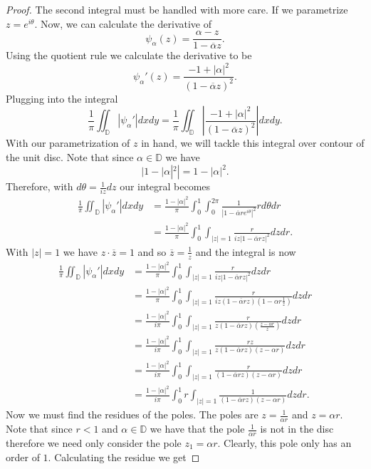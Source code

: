 \documentclass{article}
\begin{document}
\begin{proof}
  The second integral must be handled with more care. If we parametrize $z = e^{i \theta}$. Now, we can calculate the derivative of 
  \[
  \psi_{\alpha}(z) = \frac{\alpha - z}{1 - \overline{\alpha}z}.  
  \]
  Using the quotient rule we calculate the derivative to be
  \[
   \psi_{\alpha}'(z) = \frac{-1 +|\alpha|^2}{(1 - \overline{\alpha}z)^2}.
    \]
    Plugging into the integral 
    \[
    \frac{1}{\pi}\iint_{\mathbb{D}} |\psi_{\alpha}'|dxdy = \frac{1}{\pi}\iint_{\mathbb{D}} \left|\frac{-1 + |\alpha|^2}{(1 - \overline{\alpha}z)^2} \right|dxdy.
    \]
    With our parametrization of $z$ in hand, we will tackle this integral over contour of the unit disc. Note that since $\alpha \in \mathbb{D}$ we have
    \[
    |1 - |\alpha|^2| = 1 - |\alpha|^2.  
    \]
    Therefore, with $d \theta = \frac{1}{iz}dz$ our integral becomes
    \begin{align*}
      \frac{1}{\pi}\iint_{\mathbb{D}} |\psi_{\alpha}'|dxdy &= \frac{1 - |\alpha|^2}{\pi}\int_0^1\int_{0}^{2\pi} \frac{1}{|1 - \overline{\alpha}re^{i \theta}|^2}r d\theta dr  \\
      &= \frac{1 - |\alpha|^2}{\pi}\int_0^1\int_{|z| = 1} \frac{r}{iz|1 - \overline{\alpha} rz|^2}dz dr.
    \end{align*}
    With $|z| = 1$ we have $z\cdot \overline{z} = 1$ and so $\overline{z} = \frac{1}{z}$ and the integral is now
     \begin{align*}
      \frac{1}{\pi}\iint_{\mathbb{D}}|\psi_{\alpha}'|dxdy &= \frac{1 - |\alpha|^2}{\pi}\int_0^1\int_{|z| = 1}\frac{r}{iz|1 - \overline{\alpha} rz|^2}dzdr \\
      &= \frac{1 - |\alpha|^2}{\pi}\int_0^1\int_{|z| = 1} \frac{r}{iz(1 - \overline{\alpha} r z)\left(1 - \alpha r \frac{1}{z}\right)} dz dr \\
      &= \frac{1 - |\alpha|^2}{i\pi}\int_0^1\int_{|z| = 1} \frac{r}{z(1 - \overline{\alpha} rz)\left(\frac{z - \alpha r}{z}\right)}dz dr \\
      &= \frac{1 - |\alpha|^2}{i\pi}\int_0^1\int_{|z| = 1} \frac{rz}{z(1 - \overline{\alpha} rz)\left(z - \alpha r\right)}dz dr \\
      &= \frac{1 - |\alpha|^2}{i\pi}\int_0^1\int_{|z| = 1} \frac{r}{(1 - \overline{\alpha} rz)\left(z - \alpha r\right)}dz dr \\
      &= \frac{1 - |\alpha|^2}{i \pi}\int_0^1 r \int_{|z| = 1} \frac{1}{(1 - \overline{\alpha} r z)(z - \alpha r)}dzdr.
     \end{align*}
     Now we must find the residues of the poles. The poles are $z = \frac{1}{\alpha r}$ and $z = \alpha r$. Note that since $r < 1$ and $\alpha \in \mathbb{D}$ we have that the pole $ \frac{1}{\alpha r}$ is not in the disc therefore we need only consider the pole $z_1 = \alpha r$. Clearly, this pole only has an order of $1$. Calculating the residue we get

\end{proof}
\end{document}
